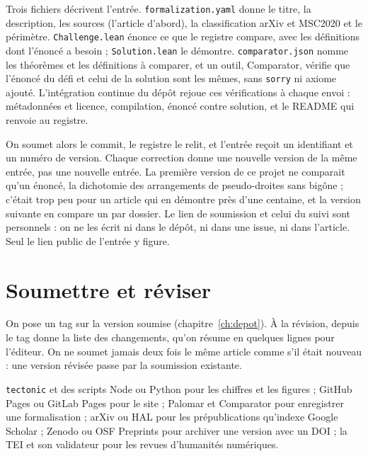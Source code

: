 Trois fichiers décrivent l'entrée. \texttt{formalization.yaml} donne le titre, la
description, les sources (l'article d'abord), la classification arXiv et MSC2020 et le
périmètre. \texttt{Challenge.lean} énonce ce que le registre compare, avec les définitions
dont l'énoncé a besoin ; \texttt{Solution.lean} le démontre. \texttt{comparator.json} nomme
les théorèmes et les définitions à comparer, et un outil, Comparator, vérifie que l'énoncé
du défi et celui de la solution sont les mêmes, sans \texttt{sorry} ni axiome ajouté.
L'intégration continue du dépôt rejoue ces vérifications à chaque envoi : métadonnées et
licence, compilation, énoncé contre solution, et le README qui renvoie au registre.

On soumet alors le commit, le registre le relit, et l'entrée reçoit un identifiant et un
numéro de version. Chaque correction donne une nouvelle version de la même entrée, pas une
nouvelle entrée. La première version de ce projet ne comparait qu'un énoncé, la
dichotomie des arrangements de pseudo-droites sans bigône ; c'était trop peu pour un
article qui en démontre près d'une centaine, et la version suivante en compare un par
dossier. Le lien de soumission et celui du suivi sont personnels : on ne les écrit ni dans
le dépôt, ni dans une issue, ni dans l'article. Seul le lien public de l'entrée y figure.

\section{Soumettre et réviser}

On pose un tag sur la version soumise (chapitre~\ref{ch:depot}). À la révision,  depuis
le tag donne la liste des changements, qu'on résume en quelques lignes pour l'éditeur.
On ne soumet jamais deux fois le même article comme s'il était nouveau : une version
révisée passe par la soumission existante.

\begin{outils}
\texttt{tectonic} et des scripts Node ou Python pour les chiffres et les figures ;
GitHub Pages ou GitLab Pages pour le site ; Palomar et Comparator pour enregistrer une formalisation ; arXiv ou HAL pour les prépublications qu'indexe Google
Scholar ; Zenodo ou OSF Preprints pour archiver une version avec un DOI ; la TEI et son
validateur pour les revues d'humanités numériques.
\end{outils}
